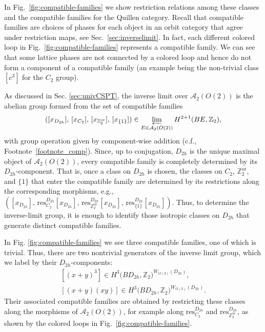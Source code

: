 \documentclass[aps,prx,reprint,superscriptaddress,twocolumn,amsmath,amssymb,amsfonts, nofootinbib]{revtex4-2}
\newcommand{\qa}{\mathcal{A}_{2}}
\newcommand{\res}{\text{res}}
\newcommand{\Z}{\mathbb{Z}}
\theoremstyle{apsstyle}
\begin{document}
In Fig.~\ref{fig:compatible-families} we show restriction relations among these classes and the compatible families for the Quillen category. Recall that compatible families are choices of phases for each object in an orbit category that agree under restriction maps, see Sec.~\ref{sec:inverselimit}.  In fact, each different colored loop in Fig.~\ref{fig:compatible-families} represents a compatible family. We can see that some lattice phases are not connected by a colored loop and hence do not form a component of a compatible family (an example being the non-trivial class $[c^3]$ for the $C_2$ group).




As discussed in Sec. \ref{sec:univCSPT}, the inverse limit over $\qa(O(2))$ is the abelian group formed from the set of compatible families
\begin{equation*}
([x_{D_{2h}}],\,[x_{C_2}],\,[x_{\mathbb Z_2^{\mathrm{or}}}],\,[x_{\{1\}}])\in \varprojlim_{E\in \qa(O(2))} H^{2+1}(BE, \Z_{2}),
\end{equation*}
with group operation given by component-wise addition (c.f., Footnote~\ref{footnote_comp}). Since, up to conjugation, $D_{2h}$ is the unique maximal object of $\qa(O(2))$, every compatible family is completely determined by its $D_{2h}$-component. That is, once a class on $D_{2h}$ is chosen, the classes on $C_2$, $\mathbb Z_2^{\mathrm{or}}$, and $\{1\}$ that enter the compatible family are determined by its restrictions along the corresponding morphisms, e.g., $([x_{D_{2h}}],\,\res^{D_{2h}}_{C_{2}}[x_{D_{2h}}],\,\res^{D_{2h}}_{\Z_{2}^{\mathrm{or}}}[x_{D_{2h}}],\,\res^{D_{2h}}_{\{1\}}[x_{D_{2h}}])$. Thus, to determine the inverse-limit group, it is enough to identify those isotropic classes on $D_{2h}$ that generate distinct compatible families. 

In Fig. \ref{fig:compatible-families} we see three compatible families, one of which is trivial. Thus, there are two nontrivial generators of the inverse limit group, which we label by their $D_{2h}$-components:
\begin{equation}
\begin{gathered}
    [(x{+}y)^3] \in H^{3}\big(BD_{2h}, \mathbb Z_{2}\big)^{W_{O(2)}(D_{2h})},
    \\
    [(x{+}y)(xy)] \in H^{3}\big(BD_{2h}, \mathbb Z_{2}\big)^{W_{O(2)}(D_{2h})}.
    \label{eq:ex1_mod2_gen}
\end{gathered}
\end{equation}
Their associated compatible families are obtained by restricting these classes along the morphisms of $\qa(O(2))$, for example along $\res^{D_{2h}}_{C_2}$ and $\res^{D_{2h}}_{\mathbb Z_2^{\mathrm{or}}}$, as shown by the colored loops in Fig.~\ref{fig:compatible-families}.
\end{document}
